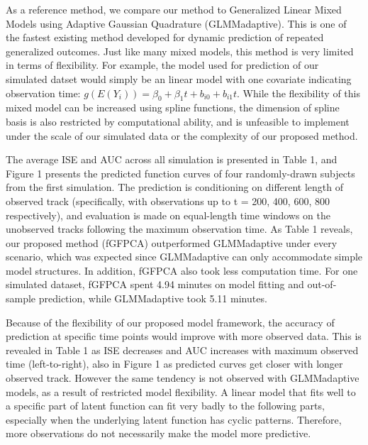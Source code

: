 \documentclass[
  11pt,
]{article}
\begin{document}
As a reference method, we compare our method to Generalized Linear Mixed
Models using Adaptive Gaussian Quadrature (GLMMadaptive). This is one of
the fastest existing method developed for dynamic prediction of repeated
generalized outcomes. Just like many mixed models, this method is very
limited in terms of flexibility. For example, the model used for
prediction of our simulated datset would simply be an linear model with
one covariate indicating observation time:
\(g(E(Y_i)) = \beta_0+\beta_1t+b_{i0}+b_{i1}t\). While the flexibility
of this mixed model can be increased using spline functions, the
dimension of spline basis is also restricted by computational ability,
and is unfeasible to implement under the scale of our simulated data or
the complexity of our proposed method.

The average ISE and AUC across all simulation is presented in Table 1,
and Figure 1 presents the predicted function curves of four
randomly-drawn subjects from the first simulation. The prediction is
conditioning on different length of observed track (specifically, with
observations up to t = 200, 400, 600, 800 respectively), and evaluation
is made on equal-length time windows on the unobserved tracks following
the maximum observation time. As Table 1 reveals, our proposed method
(fGFPCA) outperformed GLMMadaptive under every scenario, which was
expected since GLMMadaptive can only accommodate simple model
structures. In addition, fGFPCA also took less computation time. For one
simulated dataset, fGFPCA spent 4.94 minutes on model fitting and
out-of-sample prediction, while GLMMadaptive took 5.11 minutes.

Because of the flexibility of our proposed model framework, the accuracy
of prediction at specific time points would improve with more observed
data. This is revealed in Table 1 as ISE decreases and AUC increases
with maximum observed time (left-to-right), also in Figure 1 as
predicted curves get closer with longer observed track. However the same
tendency is not observed with GLMMadaptive models, as a result of
restricted model flexibility. A linear model that fits well to a
specific part of latent function can fit very badly to the following
parts, especially when the underlying latent function has cyclic
patterns. Therefore, more observations do not necessarily make the model
more predictive.
\end{document}
